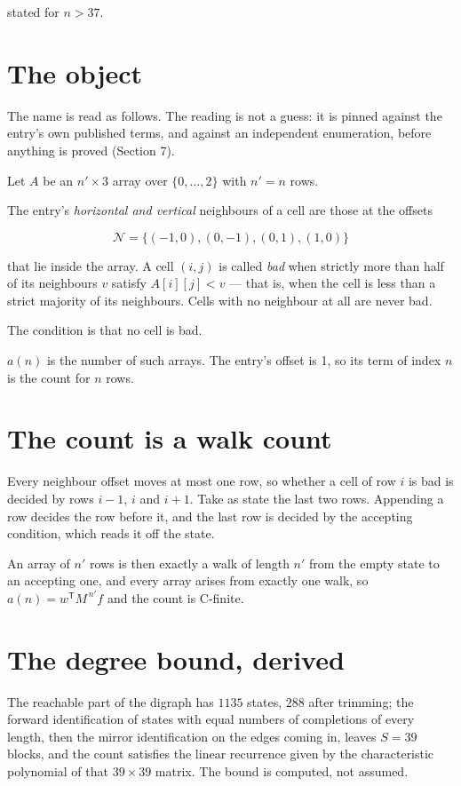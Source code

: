 \documentclass[11pt]{article}
\theoremstyle{definition}
\begin{document}
stated for $n > 37$.

\section{The object}

The name is read as follows. The reading is not a guess: it is pinned against the entry's own published terms, and against an independent enumeration, before anything is proved (Section 7).

Let $A$ be an $n' \times 3$ array over $\{0,\dots,2\}$ with $n' = n$ rows.

The entry's {\itshape horizontal and vertical} neighbours of a cell are those at the offsets

\[\mathcal{N} = \{(-1,0), (0,-1), (0,1), (1,0)\}\]

that lie inside the array. A cell $(i,j)$ is called {\itshape bad} when strictly more than half of its neighbours $v$ satisfy $A[i][j] < v$ --- that is, when the cell is less than a strict majority of its neighbours. Cells with no neighbour at all are never bad.

The condition is that no cell is bad.

$a(n)$ is the number of such arrays. The entry's offset is 1, so its term of index $n$ is the count for $n$ rows.

\section{The count is a walk count}

Every neighbour offset moves at most one row, so whether a cell of row $i$ is bad is decided by rows $i-1$, $i$ and $i+1$. Take as state the last two rows. Appending a row decides the row before it, and the last row is decided by the accepting condition, which reads it off the state.

An array of $n'$ rows is then exactly a walk of length $n'$ from the empty state to an accepting one, and every array arises from exactly one walk, so $a(n) = w^{\mathsf T}M^{\,n'}f$ and the count is C-finite.

\section{The degree bound, derived}

The reachable part of the digraph has $1135$ states, $288$ after trimming; the forward identification of states with equal numbers of completions of every length, then the mirror identification on the edges coming in, leaves $S = 39$ blocks, and the count satisfies the linear recurrence given by the characteristic polynomial of that $39\times39$ matrix. The bound is computed, not assumed.
\end{document}
